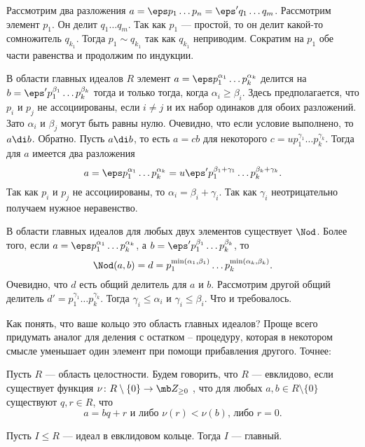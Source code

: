 \proof[Единственность] Рассмотрим два разложения $a=\eps p_1\dots p_n=\eps' q_1\dots q_m$. Рассмотрим элемент $p_1$. Он делит $q_1\dots q_m$. Так как $p_1$ --- простой, то он делит какой-то сомножитель $q_{k_1}$. Тогда $p_1\sim q_{k_1}$ так как $q_{k_1}$ неприводим. Сократим на $p_1$ обе части равенства и продолжим по индукции.
\endproof

\lm В области главных идеалов $R$ элемент $a=\eps p_1^{\alpha_1}\dots p_k^{\alpha_k}$ делится на $b=\eps' p_1^{\beta_1}\dots p_k^{\beta_k}$ тогда и только тогда, когда $\alpha_i\geq \beta_i$. Здесь предполагается, что $p_i$ и $p_j$ не ассоциированы, если $i\neq j$  и их набор одинаков для обоих разложений. Зато $\alpha_i$ и $\beta_j$ могут быть равны нулю.
\proof Очевидно, что если условие выполнено, то $a\di b$. Обратно. Пусть $a\di b$, то есть $a=cb$ для некоторого $c=up_1^{\gamma_1}\dots p_k^{\gamma_k}$. Тогда для $a$ имеется два разложения
$$a=\eps p_1^{\alpha_1}\dots p_k^{\alpha_k}=u\eps'p_1^{\beta_1+\gamma_1}\dots p_k^{\beta_k+\gamma_k}.$$
Так как $p_i$ и $p_j$ не ассоциированы, то $\alpha_i=\beta_i+\gamma_i$. Так как $\gamma_i$ неотрицательно получаем нужное неравенство.
\endproof
\elm



\lm В области главных идеалов для любых двух элементов существует $\Nod$. Более того, если $a=\eps p_1^{\alpha_1}\dots p_k^{\alpha_k}$, а $b=\eps' p_1^{\beta_1}\dots p_k^{\beta_k}$, то $$\Nod(a,b)=d=p_1^{\min(\alpha_1,\beta_1)}\dots p_k^{\min(\alpha_k,\beta_k)}.$$
\proof
Очевидно, что $d$ есть общий делитель для $a$ и $b$. Рассмотрим другой общий делитель $d'=p_1^{\gamma_1}\dots p_k^{\gamma_k}$. Тогда $\gamma_i\leq \alpha_i$ и $\gamma_i\leq \beta_i$. Что и требовалось.
\endproof
\elm







Как понять, что ваше кольцо это область главных идеалов? Проще всего придумать аналог для деления с остатком -- процедуру, которая в некотором смысле уменьшает один элемент при помощи прибавления другого. Точнее:

 Пусть $R$ --- область целостности. Будем говорить, что $R$ --- евклидово, если существует функция $\nu \colon R\setminus \{0 \}\to \mb Z_{\geq 0}$ , что для любых $a,b \in R\setminus \{0\}$ существуют $q,r\in R$, что
$$a=bq+r \text{ и либо $\nu(r)<\nu(b)$, либо } r=0.$$
\edfn



 Пусть $I\leq R$ --- идеал в евклидовом кольце. Тогда $I$ --- главный.
\ethrm

